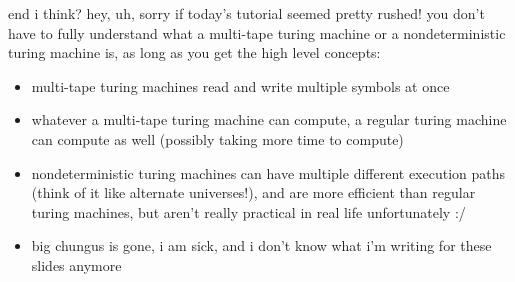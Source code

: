 \documentclass{beamer}
\begin{document}
\begin{frame}{end i think?}
hey, uh, sorry if today's tutorial seemed pretty rushed! you don't have to fully understand what a multi-tape turing machine or a nondeterministic turing machine is, as long as you get the high level concepts:
\begin{itemize}
\item multi-tape turing machines read and write multiple symbols at once
\item whatever a multi-tape turing machine can compute, a regular turing machine can compute as well (possibly taking more time to compute)
\item nondeterministic turing machines can have multiple different execution paths (think of it like alternate universes!), and are more efficient than regular turing machines, but aren't really practical in real life unfortunately :/
\item big chungus is gone, i am sick, and i don't know what i'm writing for these slides anymore
\end{itemize}
\end{frame}
\end{document}
